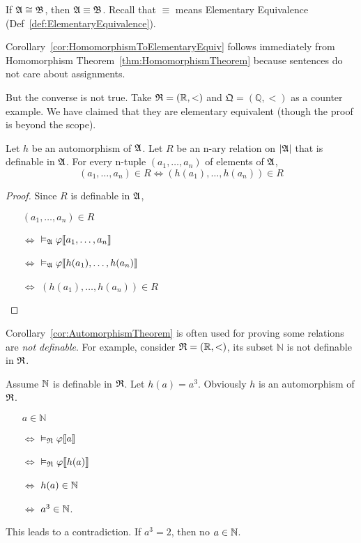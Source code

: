 \begin{corollary}
    \label{cor:HomomorphismToElementaryEquiv}
    If $\mathfrak{A} \cong \mathfrak{B}$, then $\mathfrak{A} \equiv \mathfrak{B}$. Recall that $\equiv$ means Elementary Equivalence (Def~\ref{def:ElementaryEquivalence}).
\end{corollary}

Corollary~\ref{cor:HomomorphismToElementaryEquiv} follows immediately from Homomorphism Theorem~\ref{thm:HomomorphismTheorem} because sentences do not care about assignments.

But the converse is not true. Take $\mathfrak{R} = (\mathbb{R}, <)$ and $\mathfrak{Q}=(\mathbb{Q}, <)$ as a counter example. We have claimed that they are elementary equivalent (though the proof is beyond the scope).

\begin{corollary}
    \label{cor:AutomorphismTheorem}
    Let $h$ be an automorphism of $\mathfrak{A}$. Let $R$ be an n-ary relation on $|\mathfrak{A}|$ that is definable in $\mathfrak{A}$. For every n-tuple $(a_1,\dots,a_n)$ of elements of $\mathfrak{A}$,
    \[ (a_1,\dots,a_n) \in R \iff (h(a_1),\dots,h(a_n)) \in R \]
\end{corollary}
\begin{proof}
    Since $R$ is definable in $\mathfrak{A}$,
    \begin{itemize}
        \item[] $(a_1,\dots,a_n) \in R$
        \item[$\iff$] $\vDash_{\mathfrak{A}}\varphi\llbracket a_1,\dots,a_n \rrbracket$ 
        \item[$\iff$] $\vDash_{\mathfrak{A}}\varphi\llbracket h(a_1),\dots,h(a_n) \rrbracket$ 
        \item[$\iff$] $(h(a_1),\dots,h(a_n))\in R$ 
    \end{itemize}
\end{proof}

Corollary~\ref{cor:AutomorphismTheorem} is often used for proving some relations are \emph{not definable}. For example, consider $\mathfrak{R} = (\mathbb{R}, <)$, its subset $\mathbb{N}$ is not definable in $\mathfrak{R}$.

Assume $\mathbb{N}$ is definable in $\mathfrak{R}$. Let $h(a)=a^3$. Obviously $h$ is an automorphism of $\mathfrak{R}$.

\begin{itemize}
    \item[] $a \in \mathbb{N}$
    \item[$\iff$] $\vDash_{\mathfrak{R}}\varphi\llbracket a \rrbracket$
    \item[$\iff$] $\vDash_{\mathfrak{R}}\varphi\llbracket h(a) \rrbracket$
    \item[$\iff$] $h(a)\in\mathbb{N}$
    \item[$\iff$] $a^3 \in \mathbb{N}$.  
\end{itemize}

This leads to a contradiction. If $a^3 = 2$, then no $a \in \mathbb{N}$.
